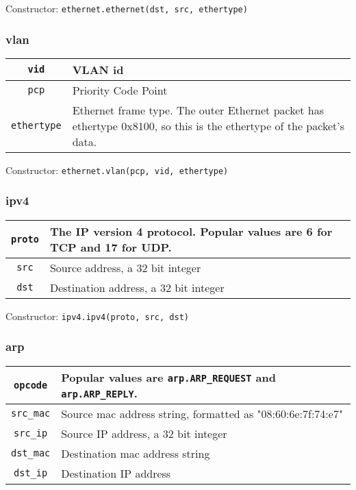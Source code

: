 \bigskip
Constructor: \texttt{ethernet.ethernet(dst, src, ethertype)}

\subsubsection{vlan}

\bigskip
\begin{tabularx}{6in}{|c|X|}
\hline\hline
\texttt{vid} & VLAN id 
\\ \hline
\texttt{pcp} & Priority Code Point 
\\ \hline
\texttt{ethertype} & Ethernet frame type.  
The outer Ethernet packet has ethertype 0x8100, so this is the ethertype of the packet's data.
\\ \hline\hline
\end{tabularx}

\bigskip
Constructor: \texttt{ethernet.vlan(pcp, vid, ethertype)}

\subsubsection{ipv4}

\bigskip
\begin{tabularx}{6in}{|c|X|}
\hline\hline
\texttt{proto} & The IP version 4 protocol.  
Popular values are  6 for TCP and 17 for UDP.
\\ \hline
\texttt{src} & Source address, a 32 bit integer 
\\ \hline
\texttt{dst} & Destination address, a 32 bit integer
\\ \hline\hline
\end{tabularx}

\bigskip
Constructor: \texttt{ipv4.ipv4(proto, src, dst)}

\subsubsection{arp}

\bigskip
\begin{tabularx}{6in}{|c|X|}
\hline\hline
\texttt{opcode} & Popular values are \texttt{arp.ARP\_REQUEST} and \texttt{arp.ARP\_REPLY}.  
\\ \hline
\texttt{src\_mac} & Source mac address string, formatted as "08:60:6e:7f:74:e7"  
\\ \hline
\texttt{src\_ip} & Source IP address, a 32 bit integer  
\\ \hline
\texttt{dst\_mac} & Destination mac address string  
\\ \hline
\texttt{dst\_ip} & Destination IP address  
\\ \hline\hline
\end{tabularx}


